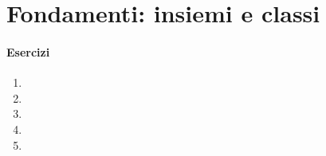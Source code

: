 \chapter{Fondamenti: insiemi e classi}\label{fondamenti}
\subsubsection*{Esercizi}
\begin{enumerate}
	\item
	\item
	\item
	\item
	\item
\end{enumerate}
